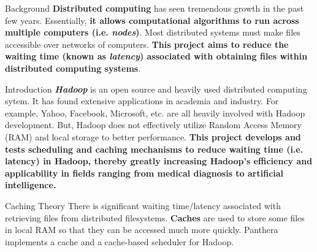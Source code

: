 \documentclass[final]{beamer} %
\begin{document}
  \begin{frame}
    \begin{center}

      \textcolor{black}{
      \textbf{}
      \vspace{0.5em}
      \textbf{}}
    \end{center}
    
    \begin{columns}[t]
     \begin{column}{0.32\textwidth}
      \begin{block}{Background}
      \textbf{Distributed computing} has seen tremendous growth in the past few years. 
      Essentially, \textbf{it allows computational algorithms to run across multiple
      computers (i.e. \textit{nodes})}. Most distributed systems must make files accessible over 	networks of computers. \textbf{This 
      project aims to reduce the waiting time (known as \textit{latency}) associated
      with obtaining files within distributed computing systems}.
      \end{block}
      \begin{block}{Introduction}
      \textbf{\textit{Hadoop}} is an open source and heavily used distributed computing sytem. It has found extensive applications in academia and industry. For example, Yahoo, Facebook, Microsoft, etc. are all heavily involved with Hadoop development. But, Hadoop does not effectively utilize Random Access Memory (RAM) and local storage to better performance. \textbf{This project develops and tests scheduling and caching mechanisms to reduce waiting time (i.e. latency) in Hadoop, thereby greatly increasing Hadoop's efficiency and applicability in fields ranging from medical diagnosis to artificial intelligence.}
      \end{block}

	\begin{block}{Caching Theory}
	There is significant waiting time/latency associated with retrieving files from distributed filesystems. \textbf{Caches} are used to store
	some files in local RAM so that they can be accessed much more quickly. Panthera implements a cache and a cache-based scheduler for Hadoop.
	\end{block}
	

\end{column}
\end{columns}
\end{frame}
\end{document}
